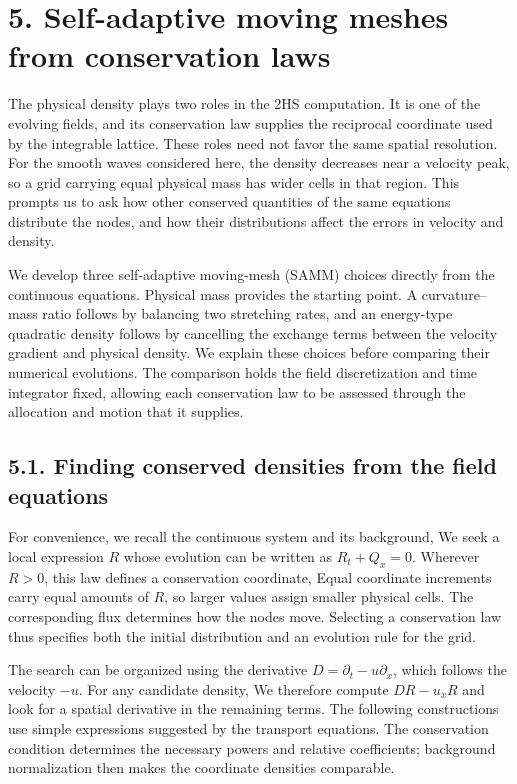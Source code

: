 \section*{5. Self-adaptive moving meshes from conservation laws}

The physical density plays two roles in the 2HS computation. It is one of the evolving fields, and its conservation law supplies the reciprocal coordinate used by the integrable lattice. These roles need not favor the same spatial resolution. For the smooth waves considered here, the density decreases near a velocity peak, so a grid carrying equal physical mass has wider cells in that region. This prompts us to ask how other conserved quantities of the same equations distribute the nodes, and how their distributions affect the errors in velocity and density.

We develop three self-adaptive moving-mesh (SAMM) choices directly from the continuous equations. Physical mass provides the starting point. A curvature--mass ratio follows by balancing two stretching rates, and an energy-type quadratic density follows by cancelling the exchange terms between the velocity gradient and physical density. We explain these choices before comparing their numerical evolutions. The comparison holds the field discretization and time integrator fixed, allowing each conservation law to be assessed through the allocation and motion that it supplies.

\subsection*{5.1. Finding conserved densities from the field equations}

For convenience, we recall the continuous system and its background,
We seek a local expression \(R\) whose evolution can be written as \(R_t+Q_x=0\). Wherever \(R>0\), this law defines a conservation coordinate,
Equal coordinate increments carry equal amounts of \(R\), so larger values assign smaller physical cells. The corresponding flux determines how the nodes move. Selecting a conservation law thus specifies both the initial distribution and an evolution rule for the grid.

The search can be organized using the derivative \(D=\partial_t-u\partial_x\), which follows the velocity \(-u\). For any candidate density,
We therefore compute \(DR-u_xR\) and look for a spatial derivative in the remaining terms. The following constructions use simple expressions suggested by the transport equations. The conservation condition determines the necessary powers and relative coefficients; background normalization then makes the coordinate densities comparable.

